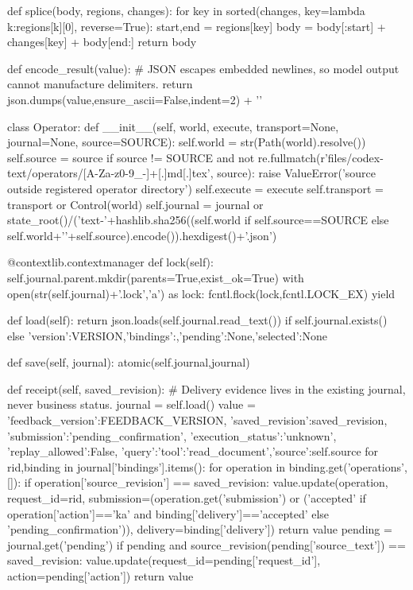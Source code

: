 def splice(body, regions, changes):
    for key in sorted(changes, key=lambda k:regions[k][0], reverse=True):
        start,end = regions[key]
        body = body[:start] + changes[key] + body[end:]
    return body

def encode_result(value):
    # JSON escapes embedded newlines, so model output cannot manufacture delimiters.
    return json.dumps(value,ensure_ascii=False,indent=2) + '\n'

class Operator:
    def __init__(self, world, execute, transport=None, journal=None, source=SOURCE):
        self.world = str(Path(world).resolve())
        self.source = source
        if source != SOURCE and not re.fullmatch(r'files/codex-text/operators/[A-Za-z0-9_-]+[.]md[.]tex', source):
            raise ValueError('source outside registered operator directory')
        self.execute = execute
        self.transport = transport or Control(world)
        self.journal = journal or state_root()/('text-'+hashlib.sha256((self.world if self.source==SOURCE else self.world+'\n'+self.source).encode()).hexdigest()+'.json')

    @contextlib.contextmanager
    def lock(self):
        self.journal.parent.mkdir(parents=True,exist_ok=True)
        with open(str(self.journal)+'.lock','a') as lock:
            fcntl.flock(lock,fcntl.LOCK_EX)
            yield

    def load(self):
        return json.loads(self.journal.read_text()) if self.journal.exists() else {'version':VERSION,'bindings':{},'pending':None,'selected':None}

    def save(self, journal): atomic(self.journal,journal)

    def receipt(self, saved_revision):
        # Delivery evidence lives in the existing journal, never business status.
        journal = self.load()
        value = {'feedback_version':FEEDBACK_VERSION, 'saved_revision':saved_revision,
                 'submission':'pending_confirmation', 'execution_status':'unknown',
                 'replay_allowed':False, 'query':{'tool':'read_document','source':self.source}}
        for rid,binding in journal['bindings'].items():
            for operation in binding.get('operations',[]):
                if operation['source_revision'] == saved_revision:
                    value.update(operation, request_id=rid,
                                 submission=(operation.get('submission') or ('accepted' if operation['action']=='ka' and binding['delivery']=='accepted' else 'pending_confirmation')),
                                 delivery=binding['delivery'])
                    return value
        pending = journal.get('pending')
        if pending and source_revision(pending['source_text']) == saved_revision:
            value.update(request_id=pending['request_id'], action=pending['action'])
        return value

